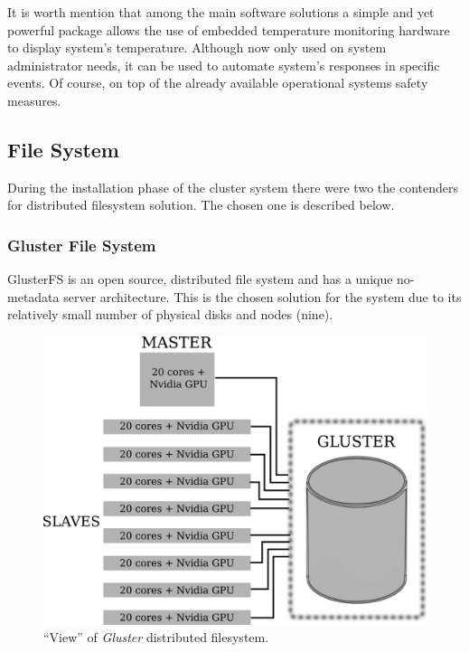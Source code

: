 \documentclass[twoside,a4paper,12pt,english]{inac19}
\begin{document}
It is worth mention that among the main software solutions a simple and yet powerful package 
allows the use of embedded temperature monitoring hardware to display system's temperature. 
Although now only used on system administrator needs, it can be used to automate system's 
responses in specific events. Of course, on top of the already available operational systems 
safety measures. 

\subsection{File System}

During the installation phase of the cluster system there were two the contenders for
distributed filesystem solution. The chosen one is described below.

\subsubsection{Gluster File System}

GlusterFS\cite{gluster} is an open source, distributed file system and has
a unique no-metadata server architecture. This is the chosen solution for the system due to its relatively
small number of physical disks and nodes (nine).

\begin{figure}[ht] %
  \centering\includegraphics[scale=0.7]{images/cluster-gluster.png}
  \caption{``View'' of \textit{Gluster} distributed filesystem.}
  \label{fig:cluster-gluster}
\end{figure}
\end{document}
